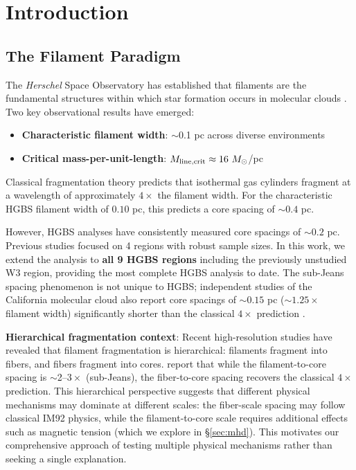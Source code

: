 \documentclass[11pt,a4paper]{article}
\begin{document}
\section{Introduction}

\subsection{The Filament Paradigm}

The \textit{Herschel} Space Observatory has established that filaments are the fundamental structures within which star formation occurs in molecular clouds \citep{Andre2010}. Two key observational results have emerged:

\begin{itemize}
    \item \textbf{Characteristic filament width}: $\sim$0.1 pc across diverse environments \citep{Arzoumanian2011}
    \item \textbf{Critical mass-per-unit-length}: $M_{\rm line,crit} \approx 16~M_\odot$/pc \citep{Ostriker1964}
\end{itemize}

Classical fragmentation theory \citep{Inutsuka1992} predicts that isothermal gas cylinders fragment at a wavelength of approximately $4\times$ the filament width. For the characteristic HGBS filament width of $0.10$ pc, this predicts a core spacing of $\sim0.4$ pc.

However, HGBS analyses have consistently measured core spacings of $\sim0.2$ pc. Previous studies focused on 4 regions with robust sample sizes. In this work, we extend the analysis to \textbf{all 9 HGBS regions} including the previously unstudied W3 region, providing the most complete HGBS analysis to date. The sub-Jeans spacing phenomenon is not unique to HGBS; independent studies of the California molecular cloud also report core spacings of $\sim0.15$ pc ($\sim1.25\times$ filament width) significantly shorter than the classical $4\times$ prediction \citep{Zhang2024}.

\textbf{Hierarchical fragmentation context}: Recent high-resolution studies \citep{Yang2024} have revealed that filament fragmentation is hierarchical: filaments fragment into fibers, and fibers fragment into cores. \citet{Yang2024} report that while the filament-to-core spacing is $\sim$2--$3\times$ (sub-Jeans), the fiber-to-core spacing recovers the classical $4\times$ prediction. This hierarchical perspective suggests that different physical mechanisms may dominate at different scales: the fiber-scale spacing may follow classical IM92 physics, while the filament-to-core scale requires additional effects such as magnetic tension (which we explore in \S\ref{sec:mhd}). This motivates our comprehensive approach of testing multiple physical mechanisms rather than seeking a single explanation.
\end{document}
